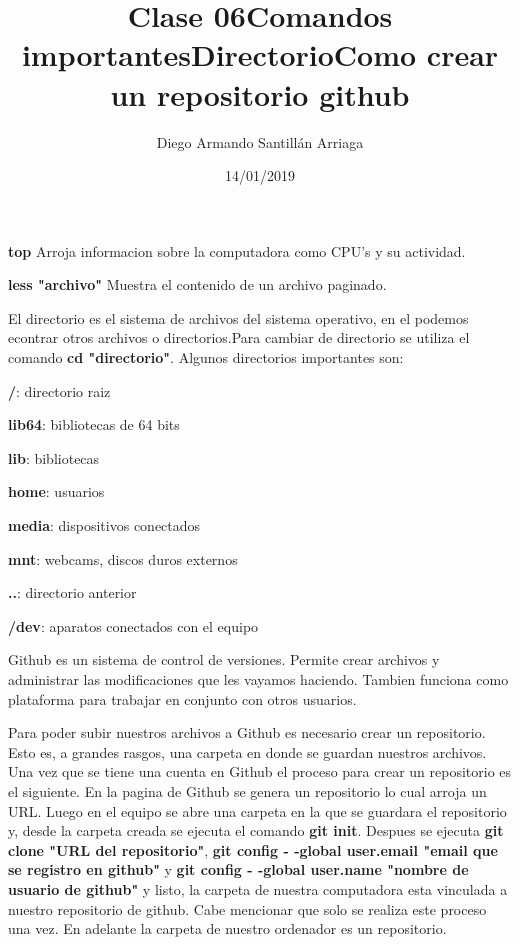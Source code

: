 \documentclass[letter paper, 12pt, oneside]{article}
\title{\Huge Clase 06}
\author{Diego Armando Santillán Arriaga}
\date{14/01/2019}
\begin{document}
	\maketitle
\newpage
\title{\huge\textbf{Comandos importantes}}

\textbf{top} Arroja informacion sobre la computadora como CPU's y su actividad.

\textbf{less "archivo"} Muestra el contenido de un archivo paginado.


\title{\huge\textbf{Directorio}}


El directorio es el sistema de archivos del sistema operativo, en el podemos econtrar otros archivos o directorios.Para cambiar de directorio se utiliza el comando \textbf{cd "directorio"}. Algunos directorios importantes son:

\textbf{/}: directorio raiz


\textbf{lib64}: bibliotecas de 64 bits


\textbf{lib}: bibliotecas


\textbf{home}: usuarios


\textbf{media}: dispositivos conectados


\textbf{mnt}: webcams, discos duros externos


\textbf{..}: directorio anterior


\textbf{/dev}: aparatos conectados con el equipo

\title{\huge\textbf{Como crear un repositorio github}}


Github es un sistema de control de versiones. Permite crear archivos y administrar las modificaciones que les vayamos haciendo. Tambien funciona como plataforma para trabajar en conjunto con otros usuarios.

Para poder subir nuestros archivos a Github es necesario crear un repositorio. Esto es, a grandes rasgos, una carpeta en donde se guardan nuestros archivos. Una vez que se tiene una cuenta en Github el proceso para crear un repositorio es el siguiente. En la pagina de Github se genera un repositorio lo cual arroja un URL. Luego en el equipo se abre una carpeta en la que se guardara el repositorio y, desde la carpeta creada se ejecuta el comando \textbf{git init}. Despues se ejecuta \textbf{git clone "URL del repositorio"}, \textbf{git config - -global user.email "email que se registro en github"} y \textbf{git config - -global user.name "nombre de usuario de github"} y listo, la carpeta de nuestra computadora esta vinculada a nuestro repositorio de github. Cabe mencionar que solo se realiza este proceso una vez. En adelante la carpeta de nuestro ordenador es un repositorio.  
\end{document}
